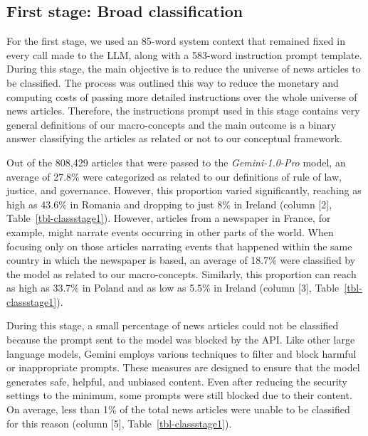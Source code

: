\documentclass[
]{agujournal2019}
\begin{document}
\subsection{First stage: Broad
classification}\label{first-stage-broad-classification}

For the first stage, we used an 85-word system context that remained
fixed in every call made to the LLM, along with a 583-word instruction
prompt template. During this stage, the main objective is to reduce the
universe of news articles to be classified. The process was outlined
this way to reduce the monetary and computing costs of passing more
detailed instructions over the whole universe of news
articles. Therefore, the instructions prompt used in this
stage contains very general definitions of our macro-concepts and the
main outcome is a binary answer classifying the articles as related or
not to our conceptual framework.

Out of the 808,429 articles that were passed to the
\emph{Gemini-1.0-Pro} model, an average of 27.8\% were categorized as
related to our definitions of rule of law, justice, and governance.
However, this proportion varied significantly, reaching as high as
43.6\% in Romania and dropping to just 8\% in Ireland (column {[}2{]},
Table~\ref{tbl-classstage1}). However, articles from a newspaper in
France, for example, might narrate events occurring in other parts of
the world. When focusing only on those articles narrating events that
happened within the same country in which the newspaper is based, an
average of 18.7\% were classified by the model as related to our
macro-concepts. Similarly, this proportion can reach as high as 33.7\%
in Poland and as low as 5.5\% in Ireland (column {[}3{]},
Table~\ref{tbl-classstage1}).

During this stage, a small percentage of news articles could not be
classified because the prompt sent to the model was blocked by the API.
Like other large language models, Gemini employs various techniques to
filter and block harmful or inappropriate prompts. These measures are
designed to ensure that the model generates safe, helpful, and unbiased
content. Even after reducing the security settings to the minimum, some
prompts were still blocked due to their content. On average, less than
1\% of the total news articles were unable to be classified for this
reason (column {[}5{]}, Table~\ref{tbl-classstage1}).
\end{document}
